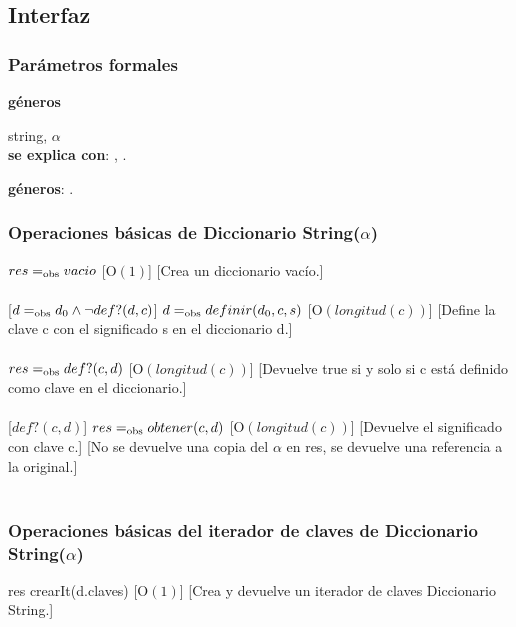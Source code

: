 \subsection{Interfaz}

  \subsubsection{Par\'ametros formales}
   \parbox{1.7cm}{\textbf{g\'eneros}} string, $\alpha$\\

  \textbf{se explica con}: , .

  \textbf{g\'eneros}: . %

  \subsubsection{Operaciones b\'asicas de Diccionario String($\alpha$)}
  {$res =_{\mathrm{obs}} vacio$}%
  [O$(1)$]
  [Crea un diccionario vac\'io.]\\\\
  [$d =_{\mathrm{obs}} d_0 \wedge \neg def?(d,c)$]
  {$d =_{\mathrm{obs}} definir(d_0,c,s)$}%
  [O$(longitud(c))$]
  [Define la clave c con el significado s en el diccionario d.]\\\\
  {$res =_{\mathrm{obs}} def?(c,d)$}%
  [O$(longitud(c))$]
  [Devuelve true si y solo si c est\'a definido como clave en el diccionario.]\\\\
  [$def?(c,d)$]
  {$res =_{\mathrm{obs}} obtener(c,d)$}%
  [O$(longitud(c))$]
  [Devuelve el significado con clave c.]
  [No se devuelve una copia del $\alpha$ en res, se devuelve una referencia a la original.]\\\\

 \subsubsection{Operaciones b\'asicas del iterador de claves de Diccionario String($\alpha$)}
  {res \igobs crearIt(d.claves) }
  [O$(1)$]
  [Crea y devuelve un iterador de claves Diccionario String.]\\\\

